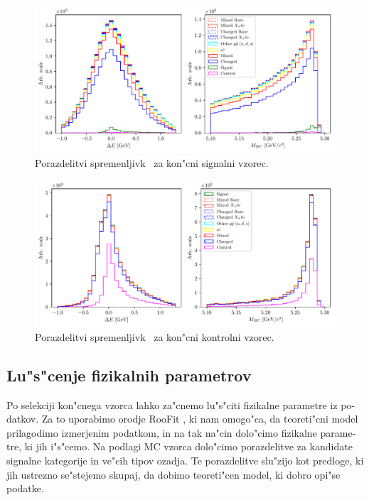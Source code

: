 \begin{otherlanguage}{slovene}
\begin{figure}[H]
	\centering
	\captionsetup{width=0.8\linewidth}
	\includegraphics[width=\linewidth]{fig/opt_uBB_si}
	\caption{Porazdelitvi spremenljivk \varss~za kon"cni signalni vzorec.}
	\label{fig:opt_uBB_si}
\end{figure}

\begin{figure}[H]
	\centering
	\captionsetup{width=0.8\linewidth}
	\includegraphics[width=\linewidth]{fig/onres_control_si}
	\caption{Porazdelitvi spremenljivk \varss~za kon"cni kontrolni vzorec.}
	\label{fig:onres_control_si}
\end{figure}

\subsection{Lu"s"cenje fizikalnih parametrov}

Po selekciji kon"cnega vzorca lahko za"cnemo lu"s"citi fizikalne parametre iz podatkov. Za to uporabimo orodje RooFit \cite{verkerke2006roofit}, ki nam omogo"ca, da teoreti"cni model prilagodimo izmerjenim podatkom, in na tak na"cin dolo"cimo fizikalne parametre, ki jih i"s"cemo. Na podlagi MC vzorca dolo"cimo porazdelitve za kandidate signalne kategorije in ve"cih tipov ozadja. Te porazdelitve slu"zijo kot predloge, ki jih ustrezno se"stejemo skupaj, da dobimo teoreti"cen model, ki dobro opi"se podatke.


\end{otherlanguage}
